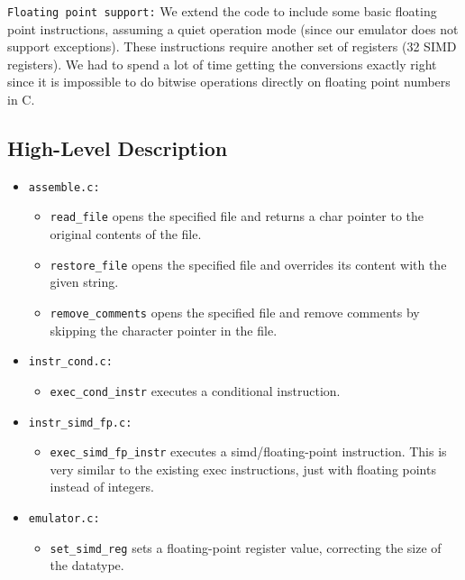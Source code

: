 \documentclass[11pt]{article}
\begin{document}
\verb|Floating point support:| We extend the code to include some basic floating point instructions, assuming a quiet operation mode (since our emulator does not support exceptions).  These instructions require another set of registers (32 SIMD registers). We had to spend a lot of time getting the conversions exactly right since it is impossible to do bitwise operations directly on floating point numbers in C.

\subsection{High-Level Description}
\begin{itemize}
        \item \verb|assemble.c:| 
        \begin{itemize}
        \item \verb|read_file| opens the specified file and returns a char pointer to the original contents of the file.
        
        \item \verb|restore_file| opens the specified file and overrides its content with the given string.

        \item \verb|remove_comments| opens the specified file and remove comments by skipping the character pointer in the file.
        \end{itemize}
        \item \verb|instr_cond.c:| 
        \begin{itemize}
        \item \verb|exec_cond_instr| executes a conditional instruction.
        \end{itemize}
        \item \verb|instr_simd_fp.c:| 
        \begin{itemize}
        \item \verb|exec_simd_fp_instr| executes a simd/floating-point instruction. This is very similar to the existing exec instructions, just with floating points instead of integers.
        \end{itemize}
        \item \verb|emulator.c:| 
        \begin{itemize}
        \item \verb|set_simd_reg| sets a floating-point register value, correcting the size of the datatype.
        

\end{itemize}
\end{itemize}
\end{document}
